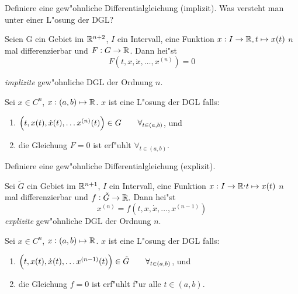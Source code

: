 \documentclass[9pt]{article}
\newcommand{\R}[1]{%
	\ifthenelse{\equal{#1}{}}
	{\mathbb{R}}
	{\mathbb{R}^{#1}}}%
\newenvironment{field}{}{\newpage}
\newif\ifnote
\newenvironment{note}{\notetrue}{\notefalse}
\newcommand{\localtag}{}
\newcommand{\globaltag}{}
\newcommand{\uuid}{}
\newcommand{\tags}[1]{
    \ifnote 
        \renewcommand{\localtag}{#1}
    \else
        \renewcommand{\globaltag}{#1}
    \fi 
    }
\newcommand{\xplain}[1]{\renewcommand{\uuid}{#1}}
\begin{document}

\tags{mathe2::1sem::GDGL}

\begin{note}
	\xplain{f3af8756-23b0-4472-bdcd-0d3c40010b44}  %
	\tags{definition, 3.1.1, 3.1.2}
	
	\begin{field}  %
		Definiere  eine gew"ohnliche Differentialgleichung (implizit).
		Was versteht man unter einer L"osung der DGL?
	\end{field}  
	
	\begin{field}  %
		Seien G ein Gebiet im $\R{n+2}$, $I$ ein Intervall, eine Funktion $x: I \rightarrow \R{}, 
		t\mapsto x(t)$ $n$ mal differenzierbar und $F: G \rightarrow \R{}$.
		Dann hei"st
		\begin{equation*}
			F(t,x,\dot{x}, \dots, x^{(n)}) = 0
		\end{equation*}
		
		\textit{implizite} gew"ohnliche DGL der Ordnung $n$. 
		
		Sei $x\in C^n$, $x: (a,b) \mapsto \R{}$.  $x$ ist eine L"osung der DGL falls:
		\begin{enumerate}
			\item $\qty(t,x(t), \dot{x}(t), \dots x^{(n)}(t)) \in G \qquad \forall_{t\in (a,b)}$, und
			\item die Gleichung $F=0$ ist erf"uhlt $\forall_{t\in (a,b)}$.
		\end{enumerate}
	\end{field}
	
	\begin{field}  %
		Definiere  eine gew"ohnliche Differentialgleichung (explizit).
	\end{field}  
	
	\begin{field}  %
				Sei $\tilde{G}$ ein Gebiet im $\R{n+1}$,  $I$ ein Intervall, eine Funktion $x: I \rightarrow \R, 
		t\mapsto x(t)$ $n$ mal differenzierbar und $f: \tilde{G} \rightarrow \R{}.$
		Dann hei"st
		\begin{equation*}
			x^{(n)} = f(t,x,\dot{x}, \dots, x^{(n-1)})
		\end{equation*}
		\textit{explizite}  gew"ohnliche DGL der Ordnung $n$.
		
		Sei $x\in C^n$, $x: (a,b) \mapsto \R{}$.  $x$ ist eine L"osung der DGL falls:
		\begin{enumerate}
			\item $\qty(t,x(t), \dot{x}(t), \dots x^{(n-1)}(t)) \in \tilde{G} \qquad \forall_{t\in (a,b)}$, und
			\item die Gleichung $f=0$ ist erf"uhlt f"ur alle $t\in (a,b)$.
		\end{enumerate}
	\end{field}
\end{note}
\end{document}
